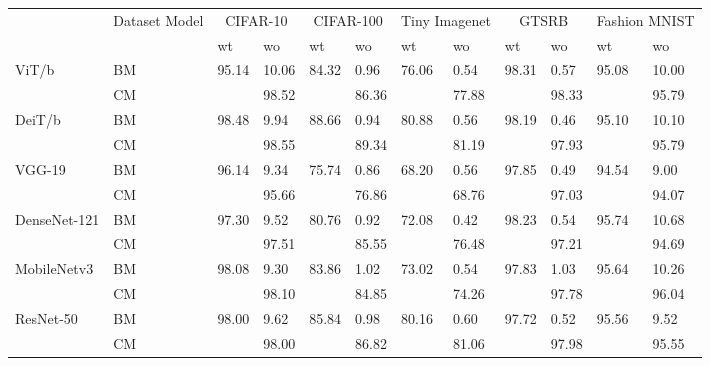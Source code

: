 \begin{tabular}{*{12}{l}}
\toprule
 &            Dataset
Model          & \multicolumn{2}{c}{CIFAR-10} & \multicolumn{2}{c}{CIFAR-100} & \multicolumn{2}{c}{Tiny Imagenet} & \multicolumn{2}{c}{GTSRB} & \multicolumn{2}{c}{Fashion MNIST} \\
 &  & wt & wo & wt & wo & wt & wo & wt & wo & wt & wo \\
\midrule
\multirow[t]{2}{*}{ViT/b} & BM & 95.14 & 10.06 & 84.32 & 0.96 & 76.06 & 0.54 & 98.31 & 0.57 & 95.08 & 10.00 \\
 & CM &  & 98.52 &  & 86.36 &  & 77.88 &  & 98.33 &  & 95.79 \\
\cline{1-12}
\multirow[t]{2}{*}{DeiT/b} & BM & 98.48 & 9.94 & 88.66 & 0.94 & 80.88 & 0.56 & 98.19 & 0.46 & 95.10 & 10.10 \\
 & CM &  & 98.55 &  & 89.34 &  & 81.19 &  & 97.93 &  & 95.79 \\
\cline{1-12}
\multirow[t]{2}{*}{VGG-19} & BM & 96.14 & 9.34 & 75.74 & 0.86 & 68.20 & 0.56 & 97.85 & 0.49 & 94.54 & 9.00 \\
 & CM &  & 95.66 &  & 76.86 &  & 68.76 &  & 97.03 &  & 94.07 \\
\cline{1-12}
\multirow[t]{2}{*}{DenseNet-121} & BM & 97.30 & 9.52 & 80.76 & 0.92 & 72.08 & 0.42 & 98.23 & 0.54 & 95.74 & 10.68 \\
 & CM &  & 97.51 &  & 85.55 &  & 76.48 &  & 97.21 &  & 94.69 \\
\cline{1-12}
\multirow[t]{2}{*}{MobileNetv3} & BM & 98.08 & 9.30 & 83.86 & 1.02 & 73.02 & 0.54 & 97.83 & 1.03 & 95.64 & 10.26 \\
 & CM &  & 98.10 &  & 84.85 &  & 74.26 &  & 97.78 &  & 96.04 \\
\cline{1-12}
\multirow[t]{2}{*}{ResNet-50} & BM & 98.00 & 9.62 & 85.84 & 0.98 & 80.16 & 0.60 & 97.72 & 0.52 & 95.56 & 9.52 \\
 & CM &  & 98.00 &  & 86.82 &  & 81.06 &  & 97.98 &  & 95.55 \\
\cline{1-12}
\bottomrule
\end{tabular}
